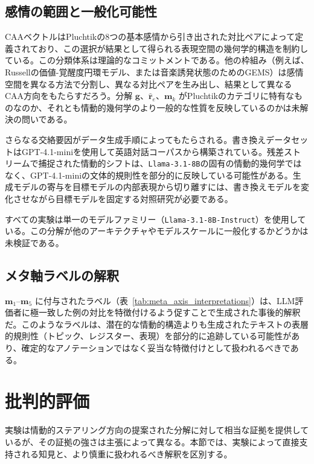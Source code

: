 \subsection{感情の範囲と一般化可能性}

CAAベクトルはPluchtikの8つの基本感情から引き出された対比ペアによって定義されており、この選択が結果として得られる表現空間の幾何学的構造を制約している。この分類体系は理論的なコミットメントである。他の枠組み（例えば、Russellの価値-覚醒度円環モデル、または音楽誘発状態のためのGEMS）は感情空間を異なる方法で分割し、異なる対比ペアを生み出し、結果として異なるCAA方向をもたらすだろう。分解 $\mathbf{g}$、$\hat{\mathbf{r}}_e$、$\mathbf{m}_k$ がPluchtikのカテゴリに特有なものなのか、それとも情動的幾何学のより一般的な性質を反映しているのかは未解決の問いである。\par

さらなる交絡要因がデータ生成手順によってもたらされる。書き換えデータセットはGPT-4.1-miniを使用して英語対話コーパスから構築されている。残差ストリームで捕捉された情動的シフトは、\texttt{Llama-3.1-8B}の固有の情動的幾何学ではなく、GPT-4.1-miniの文体的規則性を部分的に反映している可能性がある。生成モデルの寄与を目標モデルの内部表現から切り離すには、書き換えモデルを変化させながら目標モデルを固定する対照研究が必要である。\par

すべての実験は単一のモデルファミリー（\texttt{Llama-3.1-8B-Instruct}）を使用している。この分解が他のアーキテクチャやモデルスケールに一般化するかどうかは未検証である。\par

\subsection{メタ軸ラベルの解釈}

$\mathbf{m}_1$--$\mathbf{m}_5$ に付与されたラベル（表~\ref{tab:meta_axis_interpretations}）は、LLM評価者に極一致した例の対比を特徴付けるよう促すことで生成された事後的解釈だ。このようなラベルは、潜在的な情動的構造よりも生成されたテキストの表層的規則性（トピック、レジスター、表現）を部分的に追跡している可能性があり、確定的なアノテーションではなく妥当な特徴付けとして扱われるべきである。\par

\section{批判的評価}
\label{sec:eval-appraisal}

実験は情動的ステアリング方向の提案された分解に対して相当な証拠を提供しているが、その証拠の強さは主張によって異なる。本節では、実験によって直接支持される知見と、より慎重に扱われるべき解釈を区別する。\par

